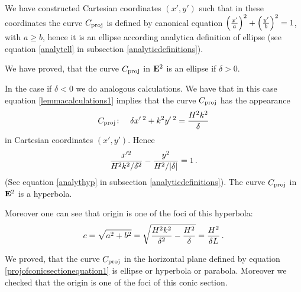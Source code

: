 \documentclass[12pt]{article}
\numberwithin{equation}{section}
\begin{document}
We have constructed Cartesian coordinates 
$(x',y')$ such that
in these coordinates the curve $C_{\rm proj}$ 
is defined by canonical equation 
    $\left({x'\over a}\right)^2+\left({y'\over b}\right)^2=1$,
with  $a\geq b$, hence it is an ellipse
according analytica definition of ellipse
(see equation \eqref{analytell} in
subsection  \ref{analyticdefinitions}).

 We have proved,
that  
the curve $C_{\rm proj}$ in ${\bf E}^2$
is an ellipse if $\delta>0$.

\m

{\footnotesize  
In the case if $\delta<0$ we do analogous calculations.
We have that in this case  equation
\eqref{lemmacalculations1} implies that
the curve $C_{{\rm proj}}$ has the appearance 
   \begin{equation*}
C_{\rm proj} \colon\quad \delta x'\,^2+k^2y'\,^2=
{H^2k^2\over\delta}
   \end{equation*}
in Cartesian coordinates
$(x',y')$.  Hence 
                     \begin{equation}\label{calculations4}
       {x'^2\over H^2k^2/\delta^2}
-{y^2\over H^2/|\delta|}=1\,.
                    \end{equation}
(See equation 
\eqref{analythyp} in subsection
\ref{analyticdefinitions}). 
The curve $C_{\rm proj}$ in ${\bf E}^2$
is a hyperbola.

Moreover one can see that origin is one of the foci
of this hyperbola:
         $$
c=\sqrt {a^2+b^2}=
              \sqrt
     { 
       {H^2k^2\over \delta^2}
             -
        {H^2\over \delta}
           }={H^2\over \delta L}\,.
         $$

}

We proved, that the curve $C_{\rm proj}$
in the horizontal plane defined by equation
 \eqref{projofconicsectionequation1}
is ellipse or hyperbola or parabola.
Moreover we checked that the origin is one
of the foci of this conic section.
\end{document}
